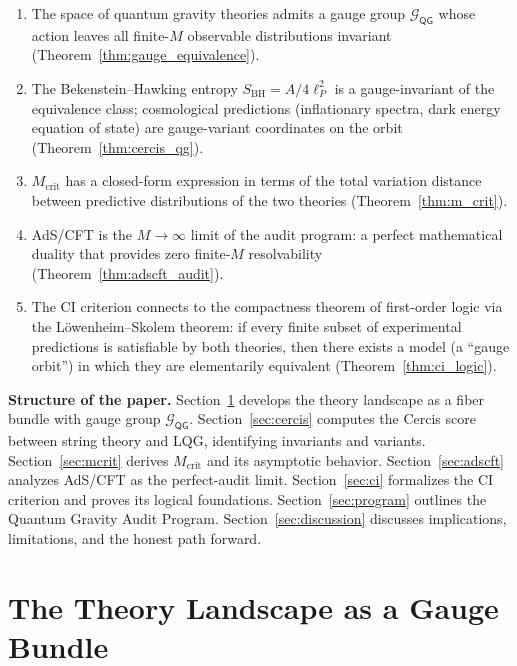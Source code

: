 \documentclass[12pt,a4paper]{article}
\theoremstyle{remark}
\newcommand{\G}{\mathcal{G}}
\newcommand{\Cercis}{\textsf{Cercis}}
\newcommand{\CI}{\textsf{CI}}
\newcommand{\QG}{\textsf{QG}}
\newcommand{\AdSCFT}{\textsf{AdS/CFT}}
\begin{document}
\begin{enumerate}[label=(\arabic*), leftmargin=*]
  \item The space of quantum gravity theories admits a gauge group $\G_{\QG}$ whose action leaves all finite-$M$ observable distributions invariant (Theorem~\ref{thm:gauge_equivalence}).
  \item The Bekenstein--Hawking entropy $S_{\text{BH}} = A/4\ell_P^2$ is a gauge-invariant of the equivalence class; cosmological predictions (inflationary spectra, dark energy equation of state) are gauge-variant coordinates on the orbit (Theorem~\ref{thm:cercis_qg}).
  \item $M_{\text{crit}}$ has a closed-form expression in terms of the total variation distance between predictive distributions of the two theories (Theorem~\ref{thm:m_crit}).
  \item \AdSCFT{} is the $M \to \infty$ limit of the audit program: a perfect mathematical duality that provides zero finite-$M$ resolvability (Theorem~\ref{thm:adscft_audit}).
  \item The \CI{} criterion connects to the compactness theorem of first-order logic via the L\"owenheim--Skolem theorem: if every finite subset of experimental predictions is satisfiable by both theories, then there exists a model (a ``gauge orbit'') in which they are elementarily equivalent (Theorem~\ref{thm:ci_logic}).
\end{enumerate}

\medskip
\noindent\textbf{Structure of the paper.}
Section~\ref{sec:gauge} develops the theory landscape as a fiber bundle with gauge group $\G_{\QG}$.
Section~\ref{sec:cercis} computes the \Cercis{} score between string theory and LQG, identifying invariants and variants.
Section~\ref{sec:mcrit} derives $M_{\text{crit}}$ and its asymptotic behavior.
Section~\ref{sec:adscft} analyzes \AdSCFT{} as the perfect-audit limit.
Section~\ref{sec:ci} formalizes the \CI{} criterion and proves its logical foundations.
Section~\ref{sec:program} outlines the Quantum Gravity Audit Program.
Section~\ref{sec:discussion} discusses implications, limitations, and the honest path forward.


\section{The Theory Landscape as a Gauge Bundle}
\label{sec:gauge}
\end{document}
